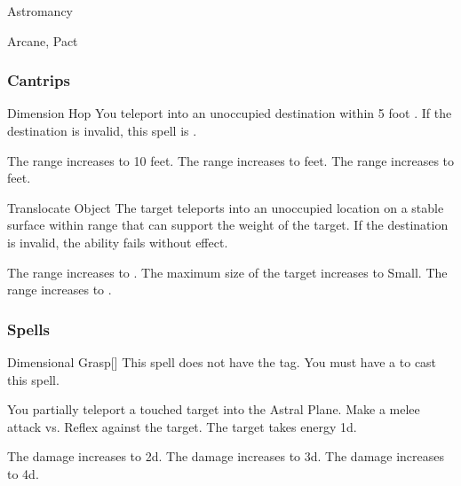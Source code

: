 \newpage
\begin{spellsection}{Astromancy}

\begin{spellheader}
\end{spellheader}


 Arcane, Pact

\subsubsection{Cantrips}


\begin{freeability}{Dimension Hop}
You teleport into an unoccupied destination within 5 foot .
If the destination is invalid, this spell is .

\rankline
{} The range increases to 10 feet.
 The range increases to \rngclose feet.
 The range increases to \rngmed feet.
\end{freeability}


\begin{freeability}{Translocate Object}
The target teleports into an unoccupied location on a stable surface within range that can support the weight of the target.
If the destination is invalid, the ability fails without effect.

\rankline
{} The range increases to \rngmed.
 The maximum size of the target increases to Small.
 The range increases to \rnglong.
\end{freeability}

\end{spellsection}


\subsubsection{Spells}


\lowercase{\hypertarget{spell:Dimensional Grasp}{}}\label{spell:Dimensional Grasp}
\begin{freeability}[Rank 1]{\hypertarget{spell:Dimensional Grasp}{Dimensional Grasp}}[]
This spell does not have the  tag.
You must have a  to cast this spell.

You partially teleport a touched target into the Astral Plane.
Make a melee attack vs. Reflex against the target.
\hit The target takes energy  \plus1d.

\rankline
{} The damage increases to  \plus2d.
 The damage increases to  \plus3d.
 The damage increases to  \plus4d.
\end{freeability}
\vspace{0.25em}



